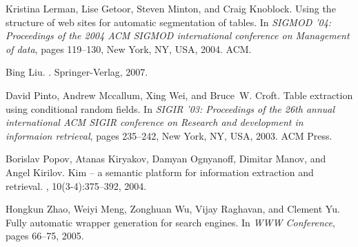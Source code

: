 \begin{thebibliography}{10}
Kristina Lerman, Lise Getoor, Steven Minton, and Craig Knoblock.
\newblock Using the structure of web sites for automatic segmentation of
  tables.
\newblock In {\em SIGMOD '04: Proceedings of the 2004 ACM SIGMOD international
  conference on Management of data}, pages 119--130, New York, NY, USA, 2004.
  ACM.

Bing Liu.
.
\newblock Springer-Verlag, 2007.

David Pinto, Andrew Mccallum, Xing Wei, and Bruce~W. Croft.
\newblock Table extraction using conditional random fields.
\newblock In {\em SIGIR '03: Proceedings of the 26th annual international ACM
  SIGIR conference on Research and development in informaion retrieval}, pages
  235--242, New York, NY, USA, 2003. ACM Press.

Borislav Popov, Atanas Kiryakov, Damyan Ognyanoff, Dimitar Manov, and Angel
  Kirilov.
\newblock Kim -- a semantic platform for information extraction and retrieval.
, 10(3-4):375--392, 2004.

Hongkun Zhao, Weiyi Meng, Zonghuan Wu, Vijay Raghavan, and Clement Yu.
\newblock Fully automatic wrapper generation for search engines.
\newblock In {\em WWW Conference}, pages 66--75, 2005.

\end{thebibliography}
